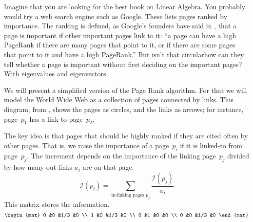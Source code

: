 
Imagine that you are looking for the best book
on Linear Algebra.
You probably would try a web search engine such as Google.
These lists pages ranked by importance.
The ranking is defined, as Google's founders have said in \cite{BrinPage}, 
that a page is important if other important
pages link to it:
``a page can have a high PageRank if there are many pages that point
to it, or if there are some pages that point to it and have a high PageRank.''
But isn't that circular\Dash how can they tell whether a page is
important without first deciding on the important pages?
With eigenvalues and eigenvectors.

We will present a simplified version of the Page Rank algorithm. 
For that we will model the World Wide Web as a collection of pages connected by
links.
This diagram, from \cite{Wills},
shows the pages as circles, and the links as arrows;
for instance, page~$p_1$ has a link to page~$p_2$. 
\begin{center}  %
  \shortstack{\rule{0em}{1.5ex} \\ \texttt{[image: jc/mp/ch5.9]} \\ \rule{0em}{1.5ex}}
\end{center}

The key idea is that pages that should be highly ranked if they are
cited often by other pages.
That is, we raise the importance of a page~$p_i$
if it is linked-to from page~$p_j$.
The increment depends on the importance of the linking page~$p_j$
divided by how many out-links $a_j$ are on that page.
\begin{equation*}
  \mathcal{I}(p_i)=\sum_{\text{in-linking pages $p_j$}}  \frac{\mathcal{I}(p_j)}{a_j}
\end{equation*}
This matrix stores the information.
\begin{equation*}
  \begin{mat}
    0   &0  &1/3  &0   \\
    1   &0  &1/3  &0   \\
    0   &1  &0    &0 \\
    0   &0  &1/3  &0
  \end{mat}
\end{equation*}

